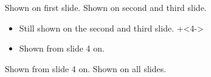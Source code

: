 \documentclass{beamer}
\begin{document}
\begin{frame}
Shown on first slide.
Shown on second and third slide.
\begin{itemize}
\item
Still shown on the second and third slide.
\onslide+<4->
\item
Shown from slide 4 on.
\end{itemize}
Shown from slide 4 on.
\onslide
Shown on all slides.
\end{frame}
\end{document}
